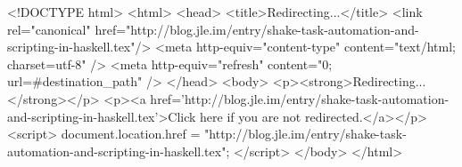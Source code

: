 <!DOCTYPE html>
<html>
<head>
<title>Redirecting...</title>
<link rel="canonical" href="http://blog.jle.im/entry/shake-task-automation-and-scripting-in-haskell.tex"/>
<meta http-equiv="content-type" content="text/html; charset=utf-8" />
<meta http-equiv="refresh" content="0; url=#{destination_path}" />
</head>
<body>
  <p><strong>Redirecting...</strong></p>
  <p><a href='http://blog.jle.im/entry/shake-task-automation-and-scripting-in-haskell.tex'>Click here if you are not redirected.</a></p>
  <script>
    document.location.href = "http://blog.jle.im/entry/shake-task-automation-and-scripting-in-haskell.tex";
  </script>
</body>
</html>
